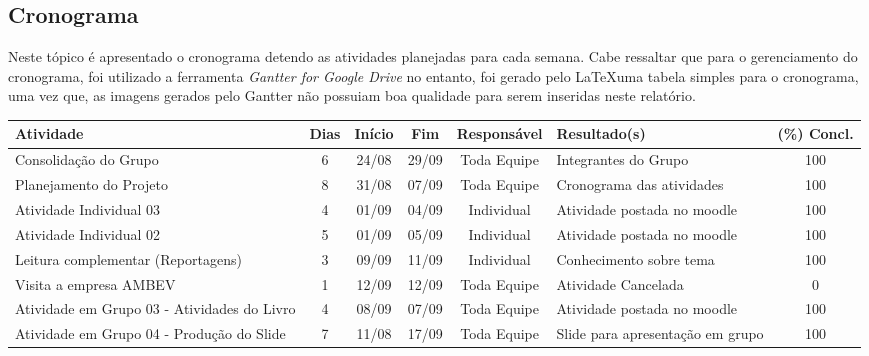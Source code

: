 \begin{landscape}
\chapter[Cronograma]{Cronograma}
\label{chap:cronograma}
	
	Neste tópico é apresentado o cronograma detendo as atividades planejadas para cada semana. Cabe ressaltar que para o gerenciamento do cronograma, foi utilizado a ferramenta \emph{Gantter for Google Drive} no entanto, foi gerado pelo \LaTeX uma tabela simples para o cronograma, uma vez que, as imagens gerados pelo Gantter não possuiam boa qualidade para serem inseridas neste relatório.

		\begin{tabular}{|p{7cm}|c|c|c|c|p{4cm}|c|}
			\hline
			Atividade & Dias & Início & Fim & Responsável & Resultado(s) & (\%) Concl. \\ \hline
			Consolidação do Grupo & 6 & 24/08 & 29/09 & Toda Equipe & Integrantes do Grupo & 100 \\ \hline
			Planejamento do Projeto & 8 & 31/08 & 07/09 & Toda Equipe & Cronograma das atividades & 100 \\ \hline
			Atividade Individual 03 & 4 & 01/09 & 04/09 & Individual & Atividade postada no moodle & 100 \\ \hline
			Atividade Individual 02 & 5 & 01/09 & 05/09 & Individual & Atividade postada no moodle & 100 \\ \hline
			Leitura complementar (Reportagens) & 3 & 09/09 & 11/09 & Individual & Conhecimento sobre tema & 100 \\ \hline
			Visita a empresa AMBEV & 1 & 12/09 & 12/09 & Toda Equipe & Atividade Cancelada & 0 \\ \hline
			Atividade em Grupo 03 - Atividades do Livro & 4 & 08/09 & 07/09 & Toda Equipe & Atividade postada no moodle & 100 \\ \hline
			Atividade em Grupo 04 - Produção do Slide & 7 & 11/08 & 17/09 & Toda Equipe & Slide para apresentação em grupo & 100 \\ \hline
		\end{tabular}


\end{landscape}

